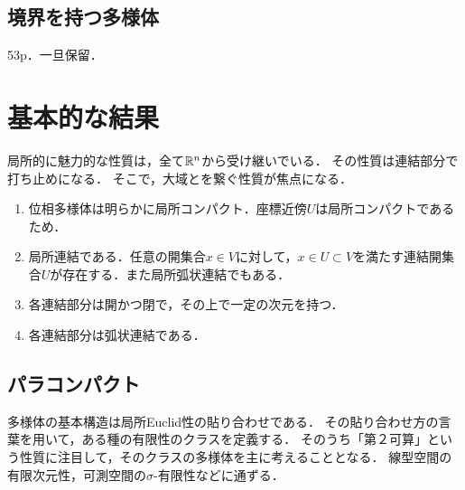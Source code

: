 \documentclass[uplatex,dvipdfmx]{jsreport}
\begin{document}
\subsection{境界を持つ多様体}

\begin{tcolorbox}[colframe=ForestGreen, colback=ForestGreen!10!white,breakable,colbacktitle=ForestGreen!40!white,coltitle=black,fonttitle=\bfseries\sffamily,
title=]
    53p．一旦保留．
\end{tcolorbox}

\section{基本的な結果}

\begin{tcolorbox}[colframe=ForestGreen, colback=ForestGreen!10!white,breakable,colbacktitle=ForestGreen!40!white,coltitle=black,fonttitle=\bfseries\sffamily,
title=]
    局所的に魅力的な性質は，全て$\mathbb{R}^n$から受け継いでいる．
    その性質は連結部分で打ち止めになる．
    そこで，大域とを繋ぐ性質が焦点になる．
    \begin{enumerate}
        \item 位相多様体は明らかに局所コンパクト．座標近傍$U$は局所コンパクトであるため．
        \item 局所連結である．任意の開集合$x\in V$に対して，$x\in U\subset V$を満たす連結開集合$U$が存在する．また局所弧状連結でもある．
        \item 各連結部分は開かつ閉で，その上で一定の次元を持つ．
        \item 各連結部分は弧状連結である．
    \end{enumerate}
\end{tcolorbox}

\subsection{パラコンパクト}

\begin{tcolorbox}[colframe=ForestGreen, colback=ForestGreen!10!white,breakable,colbacktitle=ForestGreen!40!white,coltitle=black,fonttitle=\bfseries\sffamily,
title=可微分多様体に第２可算性を仮定する理由]
    多様体の基本構造は局所Euclid性の貼り合わせである．
    その貼り合わせ方の言葉を用いて，ある種の有限性のクラスを定義する．
    そのうち「第２可算」という性質に注目して，そのクラスの多様体を主に考えることとなる．
    線型空間の有限次元性，可測空間の$\sigma$-有限性などに通ずる．
\end{tcolorbox}
\end{document}
